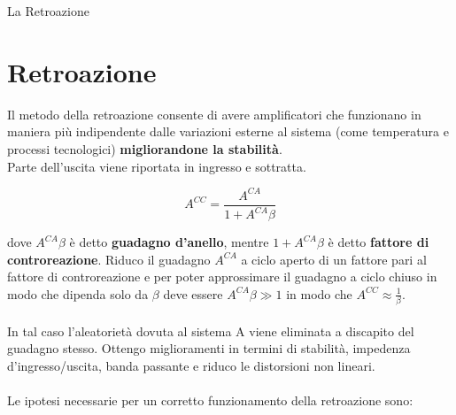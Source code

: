 \documentclass[a4paper, 12pt]{book}
\begin{document}
\begin{titlepage}
    \begin{center}
        \LARGE{La Retroazione}
    \end{center}
\end{titlepage}

\tableofcontents

\chapter{Retroazione}
Il metodo della retroazione consente di avere amplificatori che funzionano in maniera più indipendente 
dalle variazioni esterne al sistema (come temperatura e processi tecnologici) \textbf{migliorandone la stabilità}.
\\Parte dell'uscita viene riportata in ingresso e sottratta.

\begin{equation*}
    A^{CC} = \frac{A^{CA}}{1+A^{CA}\beta}
\end{equation*}

dove $A^{CA}\beta$ è detto \textbf{guadagno d'anello}, mentre $1+A^{CA}\beta$ è detto \textbf{fattore di controreazione}.
Riduco il guadagno $A^{CA}$ a ciclo aperto di un fattore pari al fattore di controreazione e per poter approssimare il guadagno a ciclo
chiuso in modo che dipenda solo da $\beta$ deve essere $A^{CA}\beta\gg1$ in modo che $A^{CC}\approx\frac{1}{\beta}$.
\\\\In tal caso l'aleatorietà dovuta al sistema A viene eliminata a discapito del guadagno stesso. Ottengo miglioramenti in termini di stabilità,
impedenza d'ingresso/uscita, banda passante e riduco le distorsioni non lineari.
\\\\Le ipotesi necessarie per un corretto funzionamento della retroazione sono:
\end{document}
